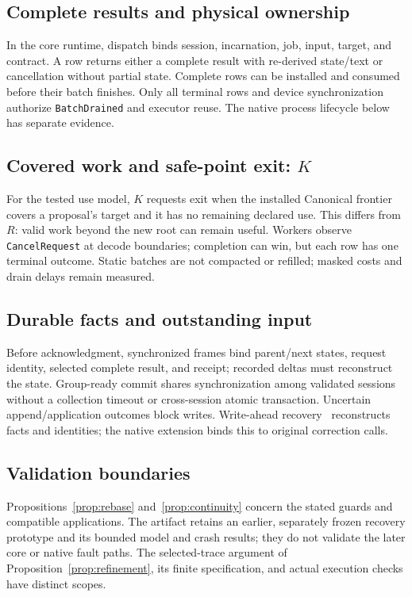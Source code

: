 \subsection{Complete results and physical ownership}
In the core runtime, dispatch binds session,
incarnation, job, input, target, and contract. A row returns either a
complete result with re-derived state/text or cancellation without partial
state. Complete rows can be installed and consumed before their batch
finishes. Only all terminal rows and device synchronization authorize
\texttt{BatchDrained} and executor reuse. The native process lifecycle
below has separate evidence.

\subsection{Covered work and safe-point exit: \texorpdfstring{$K$}{K}}
For the tested use model, $K$ requests exit when the installed Canonical
frontier covers a proposal's target and it has no remaining declared use.
This differs from $R$: valid work beyond the new root can remain useful.
Workers observe \texttt{CancelRequest} at decode boundaries; completion
can win, but each row has one terminal outcome. Static batches are not
compacted or refilled; masked costs and drain delays remain measured.

\subsection{Durable facts and outstanding input}
Before acknowledgment, synchronized frames bind parent/next states,
request identity, selected complete result, and receipt; recorded deltas
must reconstruct the state. Group-ready commit shares synchronization
among validated sessions without a collection timeout or cross-session
atomic transaction. Uncertain append/application outcomes block writes.
Write-ahead recovery~\cite{mohan1992aries} reconstructs facts and identities;
the native extension binds this to original correction calls.

\subsection{Validation boundaries}
Propositions~\ref{prop:rebase} and~\ref{prop:continuity} concern the stated
guards and compatible applications. The artifact retains an earlier,
separately frozen recovery prototype and its bounded model and crash
results; they do not validate the later core or native fault paths.
The selected-trace argument of Proposition~\ref{prop:refinement}, its
finite specification, and actual execution checks have distinct scopes.
